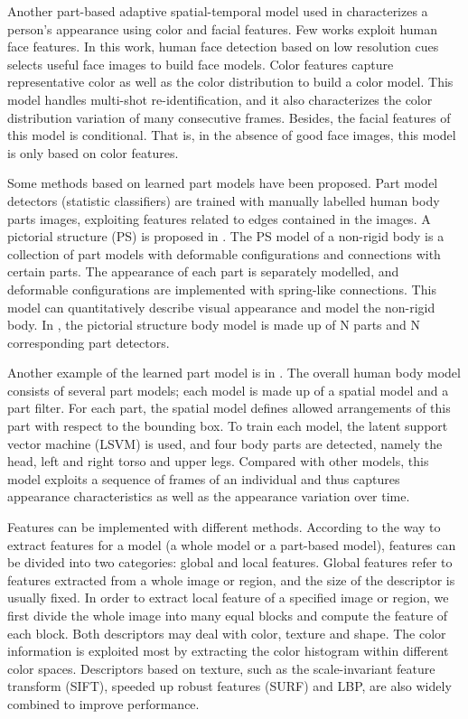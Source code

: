 \indent Another part-based adaptive spatial-temporal model used in \cite{PartbasedSTReid} characterizes a person's appearance using color and facial features. Few works exploit human face features. In this work, human face detection based on low resolution cues selects useful face images to build face models. Color features capture representative color as well as the color distribution to build a color model. This model handles multi-shot re-identification, and it also characterizes the color distribution variation of many consecutive frames.  Besides, the facial features of this model is conditional. That is, in the absence of good face images, this model is only based on color features.

Some methods based on learned part models have been proposed. Part model detectors (statistic classifiers) are trained with manually labelled human body parts images, exploiting features related to edges contained in the images. A pictorial structure (PS) is proposed in \cite{PictorialModel}. The PS model of a non-rigid body is a collection of part models with deformable configurations and connections with certain parts. The appearance of each part is separately modelled, and deformable configurations are implemented with spring-like connections. This model can quantitatively describe visual appearance and model the non-rigid body. In \cite{PSmodelRevisit}, the pictorial structure body model is made up of N parts and N corresponding part detectors. 

Another example of the learned part model is in \cite{MultiPersonREID, PartbasedSTReid}. The overall human body model consists of several part models; each model is made up of a spatial model and a part filter. For each part, the spatial model defines allowed arrangements of this part with respect to the bounding box. To train each model, the latent support vector machine (LSVM) is used, and four body parts are detected, namely the head, left and right torso and upper legs. Compared with other models, this model exploits a sequence of frames of an individual and thus captures appearance characteristics as well as the appearance variation over time.

Features can be implemented with different methods. According to the way to extract features for a model (a whole model or a part-based model), features can be divided into two categories: global and local features. Global features refer to features extracted from a whole image or region, and the size of the descriptor is usually fixed. In order to extract local feature of a specified image or region, we first divide the whole image into many equal blocks and compute the feature of each block.  Both descriptors may deal with color, texture and shape. The color information is exploited most by extracting the color histogram within different color spaces. Descriptors based on texture, such as the scale-invariant feature transform (SIFT), speeded up robust features (SURF) and LBP, are also widely combined to improve performance.

